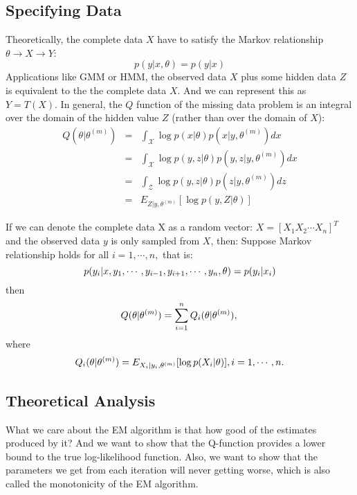 \documentclass[onecolumn,12pt]{IEEEtran}
\begin{document}
\subsection{Specifying Data}
Theoretically, the complete data $X$ have to satisfy the Markov relationship $\theta \to X \to Y$:
\begin{equation}
  p(y|x,\theta) = p(y|x)
\end{equation}
Applications like GMM or HMM, the observed data $X$ plus some hidden data $Z$ is equivalent to the the complete data $X$. And we can represent this as $Y = T(X)$. In general, the $Q$ function of the missing data problem is an integral over the domain of the hidden value $Z$ (rather than over the domain of $X$):
\begin{eqnarray}
  Q(\theta|\theta^{(m)}) & = & \int_{\mathcal{X}}\log p(x|\theta)p(x|y,\theta^{(m)})dx \nonumber\\
  & = & \int_{\mathcal{X}}\log p(y,z|\theta)p(y,z|y,\theta^{(m)})dx \nonumber\\
  & = & \int_{\mathcal{Z}}\log p(y,z|\theta)p(z|y,\theta^{(m)})dz \nonumber\\
  & = & E_{Z|y,\theta^{(m)}}[\log p(y,Z|\theta)]
\end{eqnarray}

If we can denote the complete data X as a random vector: $X = [X_1 X_2\cdots X_n]^T$ and the observed data $y$ is only sampled from $X$, then:
Suppose Markov relationship holds for all $i = 1,\cdots,n,$ that is:
\begin{equation}
  p(y_i|x,y_1,\cdots,y_{i-1},y_{i+1},\cdots,y_n,\theta) = p(y_i|x_i) \\
\end{equation}
then
\begin{equation}
  Q(\theta|\theta^{(m)}) = \sum_{i=1}^{n}Q_i(\theta|\theta^{(m)}), \\
\end{equation}
where
\begin{equation}
  Q_i(\theta|\theta^{(m)}) = E_{X_i|y_i,\theta^{(m)}}[\log p(X_i|\theta)], i=1,\cdots,n. \\
\end{equation}

\subsection{Theoretical Analysis}
What we care about the EM algorithm is that how good of the estimates produced by it? And we want to show that the Q-function provides a lower bound to the true log-likelihood function. Also, we want to show that the parameters we get from each iteration will never getting worse, which is also called the monotonicity of the EM algorithm.
\end{document}
